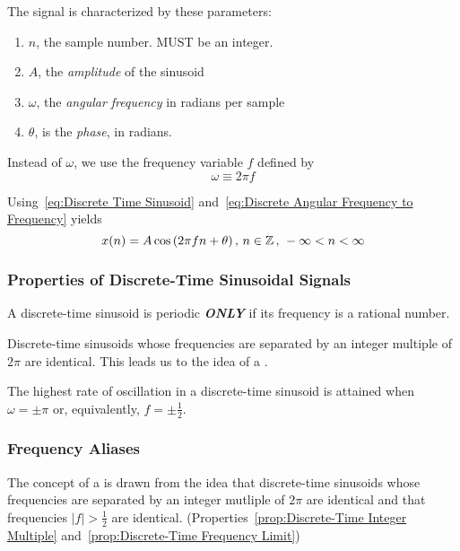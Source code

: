 The signal is characterized by these parameters:
\begin{enumerate}[noitemsep]
\item $n$, the sample number. MUST be an integer.
\item $A$, the \emph{amplitude} of the sinusoid
\item $\omega$, the \emph{angular frequency} in radians per sample
\item $\theta$, is the \emph{phase}, in radians.
\end{enumerate}

Instead of $\omega$, we use the frequency variable $f$ defined by
\begin{equation}\label{eq:Discrete Angular Frequency to Frequency}
  \omega \equiv 2 \pi f
\end{equation}

Using~\eqref{eq:Discrete Time Sinusoid} and~\eqref{eq:Discrete Angular Frequency to Frequency} yields
\begin{equation}\label{eq:Discrete Frequency Sinusoid}
  x(n) = A \cos \left( 2 \pi fn + \theta \right) \text{, } n \in \operatorname{\mathbb{Z}} \text{, } -\infty < n < \infty
\end{equation}

\subsubsection{Properties of Discrete-Time Sinusoidal Signals}\label{subsubsec:Properties Discrete-Time Sinusoids}
\begin{propertylist}
\item A discrete-time sinusoid is periodic \textbf{\emph{ONLY}} if its frequency is a rational number.
\item Discrete-time sinusoids whose frequencies are separated by an integer multiple of $2\pi$ are identical. This leads us to the idea of a .\label{prop:Discrete-Time Integer Multiple}
\item The highest rate of oscillation in a discrete-time sinusoid is attained when $\omega = \pm \pi$ or, equivalently, $f= \pm \frac{1}{2}$.\label{prop:Discrete-Time Frequency Limit}
\end{propertylist}

\subsubsection{Frequency Aliases}\label{subsubsec:Frequency Aliases}
The concept of a  is drawn from the idea that discrete-time sinusoids whose frequencies are separated by an integer mutliple of $2\pi$ are identical and that frequencies $\lvert f \rvert > \frac{1}{2}$ are identical.
(Properties~\ref{prop:Discrete-Time Integer Multiple} and~\ref{prop:Discrete-Time Frequency Limit})

